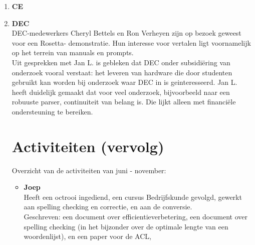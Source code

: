 \begin{enumerate}
\item {\bf CE}


\item {\bf DEC}\\
DEC-medewerkers 
Cheryl Bettels en Ron Verheyen zijn op bezoek geweest voor een Rosetta-
demonstratie. Hun interesse voor vertalen ligt voornamelijk 
op het terrein van manuals en prompts.\\

Uit gesprekken met Jan L. 
is gebleken dat DEC onder subsidi\"{e}ring van onderzoek 
vooral verstaat: het leveren van hardware die door studenten gebruikt kan 
worden bij onderzoek waar DEC in is geinteresseerd.
Jan L. heeft duidelijk gemaakt dat voor veel onderzoek,  
bijvoorbeeld naar een robuuste parser, continuiteit van belang is. Die lijkt 
alleen met financi\"{e}le ondersteuning te bereiken. 


\section{Activiteiten (vervolg)}
Overzicht van de activiteiten van juni - november:
\begin{itemize}
  \item {\bf Joep}\\
Heeft een octrooi ingediend, een cursus Bedrijfskunde gevolgd,
gewerkt aan spelling checking en correctie, en aan 
de conversie.\\ 
Geschreven: een document over efficientieverbetering, een document
over spelling checking (in het bijzonder over de optimale lengte van een 
woordenlijst), en een paper voor de ACL, 


\end{itemize}
\end{enumerate}
